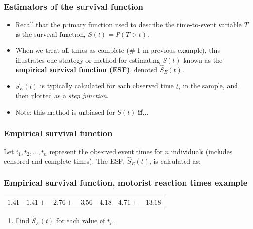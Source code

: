 \begin{frame}
\frametitle{Estimators of the survival function}
\begin{itemize}
\item Recall that the primary function used to describe the time-to-event variable $T$ is the survival function, $S(t)=P(T>t)$.

\item When we treat all times as complete (\# 1 in previous example), this  illustrates one strategy or method for estimating $S(t)$ known as the \textbf{empirical survival function (ESF)}, denoted $\widehat{S}_E(t)$.
\item $\widehat{S}_E(t)$ is typically calculated for each observed time $t_i$ in the sample, and then plotted as a \textit{step function}.
\item Note: this method is unbiased for $S(t)$ \textbf{if}...
\end{itemize}
\vskip100pt
\end{frame}

\begin{frame}
\frametitle{Empirical survival function}
 Let $t_1,t_2,\ldots,t_n$ represent the observed event times for $n$ individuals (includes censored and complete times). The ESF, $\widehat{S}_E(t)$, is calculated as:
\vskip200pt
\end{frame}


\begin{frame}
\frametitle{Empirical survival function, motorist reaction times example}
\begin{center}
\begin{tabular}{ccccccc}
$1.41$ & $1.41+$ & $2.76+$ & $3.56$ & $4.18$ &  $4.71+$   & $13.18$ \\
\end{tabular}
\end{center}
\begin{enumerate}
\item Find $\widehat{S}_E(t)$ for each value of $t_i$.
\end{enumerate}
\vskip200pt
\end{frame}

